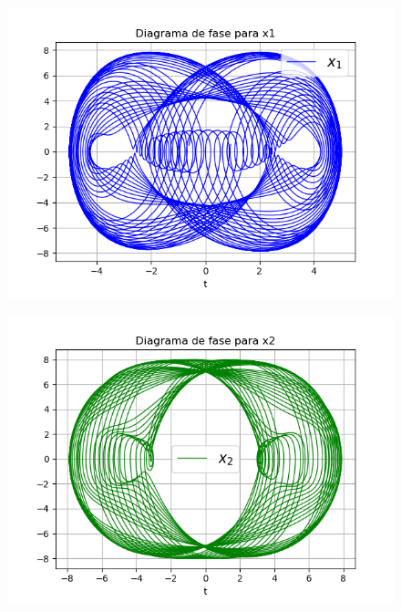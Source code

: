 \documentclass{article}
\begin{document}
\begin{figure}[H]
\centering
\includegraphics[scale=0.59]{33_f1.png}
\end{figure}

\begin{figure}[H]
\centering
\includegraphics[scale=0.59]{33_f2.png}
\end{figure}
\end{document}
